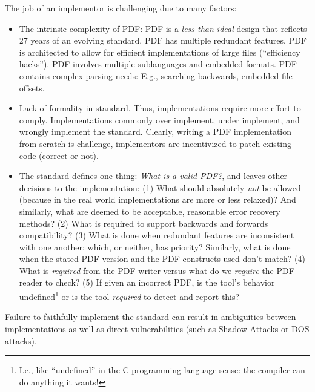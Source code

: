 The job of an implementor is challenging due to many factors:
\begin{itemize}
\item The intrinsic complexity of PDF:
  PDF is a \emph{less than ideal} design that reflects 27 years of
  an evolving standard.
  PDF has multiple redundant features.
  PDF is architected to allow for efficient implementations of
  large files (``efficiency hacks'').
  PDF involves multiple sublanguages and embedded formats.
  PDF contains complex parsing needs:
  E.g., searching backwards, embedded file offsets.
\item Lack of formality in standard. Thus, implementations
  require more effort to comply.
  Implementations commonly over implement, under implement,
  and wrongly implement the standard.
  Clearly, writing a PDF implementation from scratch is challenge,
  implementors are incentivized to patch existing code (correct or not).
\item The standard defines one thing: \emph{What is a valid PDF?},
  and leaves other decisions to the implementation:
  (1) What should absolutely \emph{not} be allowed (because in the real world
    implementations are more or less relaxed)? And similarly,
    what are deemed to be acceptable, reasonable error recovery methods?
  (2) What is required to support backwards and forwards compatibility?
  (3) What is done when redundant features are inconsistent with one
    another: which, or neither, has priority?
    Similarly, what is done when the stated PDF version and the PDF
    constructs used don't match?
  (4) What is \emph{required} from the PDF writer versus
    what do we \emph{require} the PDF reader to check?
  (5) If given an incorrect PDF, is the tool's behavior undefined\footnote{
      I.e., like ``undefined'' in the C programming language sense: the
      compiler can do anything it wants!
    } or is the tool \emph{required} to detect and report this?
\end{itemize}
Failure to faithfully implement the standard can result in ambiguities
between implementations as well as direct vulnerabilities (such as
Shadow Attacks or DOS attacks).

